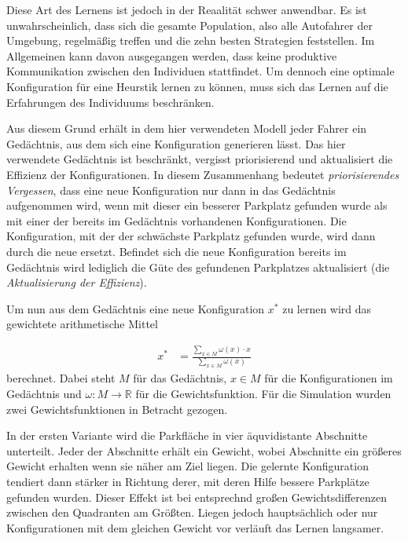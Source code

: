 Diese Art des Lernens ist jedoch in der Reaalität schwer anwendbar. Es ist unwahrscheinlich, dass sich die gesamte Population, also alle Autofahrer der Umgebung, regelmäßig treffen und die zehn besten Strategien feststellen. Im Allgemeinen kann davon ausgegangen werden, dass keine produktive Kommunikation zwischen den Individuen stattfindet. Um dennoch eine optimale Konfiguration für eine Heurstik lernen zu können, muss sich das Lernen auf die Erfahrungen des Individuums beschränken. 

Aus diesem Grund erhält in dem hier verwendeten Modell jeder Fahrer ein Gedächtnis, aus dem sich eine Konfiguration generieren lässt. Das hier verwendete Gedächtnis ist beschränkt, vergisst priorisierend und aktualisiert die Effizienz der Konfigurationen. In diesem Zusammenhang bedeutet \emph{priorisierendes Vergessen}, dass eine neue Konfiguration nur dann in das Gedächtnis aufgenommen wird, wenn mit dieser ein besserer Parkplatz gefunden wurde als mit einer der bereits im Gedächtnis vorhandenen Konfigurationen. Die Konfiguration, mit der der schwächste Parkplatz gefunden wurde, wird dann durch die neue ersetzt. Befindet sich die neue Konfiguration bereits im Gedächtnis wird lediglich die Güte des gefundenen Parkplatzes aktualisiert (die \emph{Aktualisierung der Effizienz}).

Um nun aus dem Gedächtnis eine neue Konfiguration $x^*$ zu lernen wird das gewichtete arithmetische Mittel 

\begin{align}
	x^{*} &= \frac{\sum\limits_{x \in M} \omega (x) \cdot x}{\sum\limits_{x \in M} \omega (x)}\label{form_gelernterParameter}
\end{align}
 berechnet. Dabei steht $M$ für das Gedächtnis, $x\in M$ für die Konfigurationen im Gedächtnis und $\omega : M \rightarrow \mathbb{R}$ für die Gewichtsfunktion. Für die Simulation wurden zwei Gewichtsfunktionen in Betracht gezogen.

In der ersten Variante wird die Parkfläche in vier äquvidistante Abschnitte unterteilt. Jeder der Abschnitte erhält ein Gewicht, wobei Abschnitte ein größeres Gewicht erhalten wenn sie näher am Ziel liegen. Die gelernte Konfiguration tendiert dann stärker in Richtung derer, mit deren Hilfe bessere Parkplätze gefunden wurden. Dieser Effekt ist bei entsprechnd großen Gewichtsdifferenzen zwischen den Quadranten am Größten. Liegen jedoch hauptsächlich oder nur Konfigurationen mit dem gleichen Gewicht vor verläuft das Lernen langsamer. 

